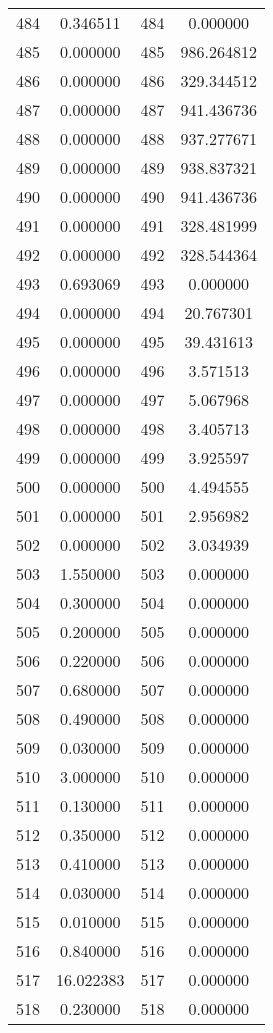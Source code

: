 \documentclass[12pt]{article}
\begin{document}
\begin{longtable}{@{}cccc@{}}
484 & 0.346511 & 484 & 0.000000 \\
485 & 0.000000 & 485 & 986.264812 \\
486 & 0.000000 & 486 & 329.344512 \\
487 & 0.000000 & 487 & 941.436736 \\
488 & 0.000000 & 488 & 937.277671 \\
489 & 0.000000 & 489 & 938.837321 \\
490 & 0.000000 & 490 & 941.436736 \\
491 & 0.000000 & 491 & 328.481999 \\
492 & 0.000000 & 492 & 328.544364 \\
493 & 0.693069 & 493 & 0.000000 \\
494 & 0.000000 & 494 & 20.767301 \\
495 & 0.000000 & 495 & 39.431613 \\
496 & 0.000000 & 496 & 3.571513 \\
497 & 0.000000 & 497 & 5.067968 \\
498 & 0.000000 & 498 & 3.405713 \\
499 & 0.000000 & 499 & 3.925597 \\
500 & 0.000000 & 500 & 4.494555 \\
501 & 0.000000 & 501 & 2.956982 \\
502 & 0.000000 & 502 & 3.034939 \\
503 & 1.550000 & 503 & 0.000000 \\
504 & 0.300000 & 504 & 0.000000 \\
505 & 0.200000 & 505 & 0.000000 \\
506 & 0.220000 & 506 & 0.000000 \\
507 & 0.680000 & 507 & 0.000000 \\
508 & 0.490000 & 508 & 0.000000 \\
509 & 0.030000 & 509 & 0.000000 \\
510 & 3.000000 & 510 & 0.000000 \\
511 & 0.130000 & 511 & 0.000000 \\
512 & 0.350000 & 512 & 0.000000 \\
513 & 0.410000 & 513 & 0.000000 \\
514 & 0.030000 & 514 & 0.000000 \\
515 & 0.010000 & 515 & 0.000000 \\
516 & 0.840000 & 516 & 0.000000 \\
517 & 16.022383 & 517 & 0.000000 \\
518 & 0.230000 & 518 & 0.000000 \\

\end{longtable}
\end{document}
